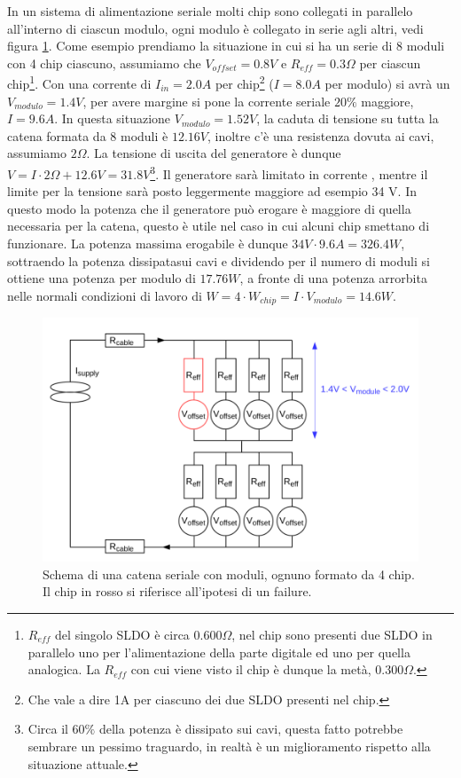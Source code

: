In un sistema di alimentazione seriale molti chip sono collegati in parallelo all'interno di ciascun modulo, ogni modulo è collegato in serie agli altri, vedi figura \ref{MCM}. 
Come esempio prendiamo la situazione in cui si ha un serie di 8 moduli con 4 chip ciascuno, assumiamo che $V_{offset}=0.8V$ e $R_{eff}=0.3 \Omega$ per ciascun chip\footnote{$R_{eff}$ del singolo SLDO è circa $0.600 \Omega$, nel chip sono presenti due SLDO in parallelo uno per l'alimentazione della parte digitale ed uno per quella analogica. La $R_{eff}$ con cui viene visto il chip è dunque la metà, $0.300\Omega$.}. 
Con una corrente di $I_{in}=2.0 A$ per chip\footnote{Che vale a dire 1A per ciascuno dei due SLDO presenti nel chip.} ($I=8.0 A$ per modulo) si avrà un $V_{modulo}=1.4 V$, per avere margine si pone la corrente seriale $20 \%$ maggiore, $I=9.6A$. 
In questa situazione $V_{modulo}=1.52V$, la caduta di tensione su tutta la catena formata da 8 moduli è $12.16V$, inoltre c'è una resistenza dovuta ai cavi, assumiamo $2 \Omega$. 
La tensione di uscita del generatore è dunque $V=I \cdot 2 \Omega +12.6V=31.8V$\footnote{Circa il $60 \%$ della potenza è dissipato sui cavi, questa fatto potrebbe sembrare un pessimo traguardo, in realtà è un miglioramento rispetto alla situazione attuale.}. 
Il generatore sarà limitato in corrente , mentre il limite per la tensione sarà posto leggermente maggiore ad esempio 34 V. 
In questo modo la potenza che il generatore può erogare è maggiore di quella necessaria per la catena, questo è utile nel caso in cui alcuni chip smettano di funzionare. 
La potenza massima erogabile è dunque $34V \cdot 9.6 A = 326.4 W$, sottraendo la potenza dissipatasui cavi e dividendo per il numero di moduli si ottiene una potenza per modulo di $17.76 W$, a fronte  di una potenza arrorbita nelle normali condizioni di lavoro di $W = 4 \cdot W_{chip} = I \cdot V_{modulo} = 14.6 W$.

\begin{figure}
\centering
\includegraphics[scale=.3]{Immagini/MultiChipModules}
\caption{Schema di una catena seriale con moduli, ognuno formato da 4 chip. Il chip in rosso si riferisce all'ipotesi di un failure.}
\label{MCM}
\end{figure}

